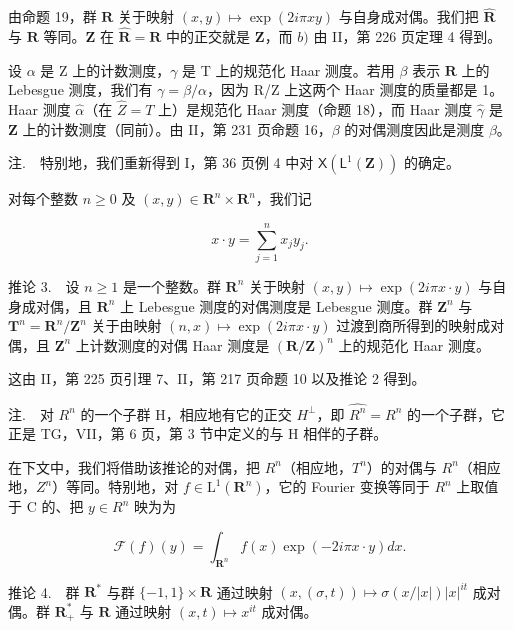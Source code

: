 由命题 19，群 \(\mathbf{R}\) 关于映射 \((x,y)\mapsto \exp (2i\pi xy)\) 与自身成对偶。我们把 \(\widehat{\mathbf{R}}\) 与 \(\mathbf{R}\) 等同。\(\mathbf{Z}\) 在 \(\widehat{\mathbf{R}} = \mathbf{R}\) 中的正交就是 \(\mathbf{Z}\)，而 \(b)\) 由 II，第 226 页定理 4 得到。

设 \(\alpha\) 是 Z 上的计数测度，\(\gamma\) 是 T 上的规范化 Haar 测度。若用 \(\beta\) 表示 \(\mathbf{R}\) 上的 Lebesgue 测度，我们有 \(\gamma = \beta/\alpha\)，因为 R/Z 上这两个 Haar 测度的质量都是 1。Haar 测度 \(\widehat{\alpha}\)（在 \(\widehat{Z} = T\) 上）是规范化 Haar 测度（命题 18），而 Haar 测度 \(\widehat{\gamma}\) 是 \(\mathbf{Z}\) 上的计数测度（同前）。由 II，第 231 页命题 16，\(\beta\) 的对偶测度因此是测度 \(\beta\)。

注.　特别地，我们重新得到 I，第 36 页例 4 中对 \(\mathsf{X}(\mathsf{L}^{1}(\mathbf{Z}))\) 的确定。

对每个整数 \(n \geqslant 0\) 及 \((x, y) \in \mathbf{R}^n \times \mathbf{R}^n\)，我们记

\[
x \cdot y = \sum_ {j = 1} ^ {n} x _ {j} y _ {j}.
\]

推论 3.　设 \(n \geqslant 1\) 是一个整数。群 \(\mathbf{R}^{n}\) 关于映射 \((x,y) \mapsto \exp(2i\pi x \cdot y)\) 与自身成对偶，且 \(\mathbf{R}^{n}\) 上 Lebesgue 测度的对偶测度是 Lebesgue 测度。群 \(\mathbf{Z}^{n}\) 与 \(\mathbf{T}^{n} = \mathbf{R}^{n}/\mathbf{Z}^{n}\) 关于由映射 \((n,x) \mapsto \exp(2i\pi x \cdot y)\) 过渡到商所得到的映射成对偶，且 \(\mathbf{Z}^{n}\) 上计数测度的对偶 Haar 测度是 \((\mathbf{R}/\mathbf{Z})^{n}\) 上的规范化 Haar 测度。

这由 II，第 225 页引理 7、II，第 217 页命题 10 以及推论 2 得到。

注.　对 \(R^{n}\) 的一个子群 H，相应地有它的正交 \(H^{\perp}\)，即 \(\widehat{R^{n}} = R^{n}\) 的一个子群，它正是 TG，VII，第 6 页，第 3 节中定义的与 H 相伴的子群。

在下文中，我们将借助该推论的对偶，把 \(R^{n}\)（相应地，\(T^{n}\)）的对偶与 \(R^{n}\)（相应地，\(Z^{n}\)）等同。特别地，对 \(f \in \mathrm{L}^{1}(\mathbf{R}^{n})\)，它的 Fourier 变换等同于 \(R^{n}\) 上取值于 C 的、把 \(y \in R^{n}\) 映为为

\[
\mathcal {F} (f) (y) = \int_ {\mathbf {R} ^ {n}} f (x) \exp (- 2 i \pi x \cdot y) d x.
\]

推论 4.　群 \(\mathbf{R}^{*}\) 与群 \(\{-1,1\} \times \mathbf{R}\) 通过映射 \((x,(\sigma,t)) \mapsto \sigma(x/|x|)|x|^{it}\) 成对偶。群 \(\mathbf{R}_{+}^{*}\) 与 \(\mathbf{R}\) 通过映射 \((x,t) \mapsto x^{it}\) 成对偶。


